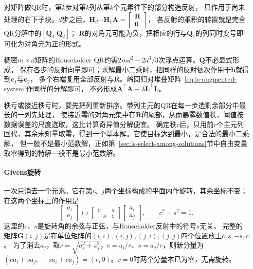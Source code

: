 对矩阵做QR时，第$k$步对第$k$列从第$k$个元素往下的部分构造反射，
只作用于尚未处理的右下子块。$d$步之后，$\bm H_d\cdots\bm H_1\bm A=\left[\begin{smallmatrix}\bm R\\\bm0\end{smallmatrix}\right]$，
各反射的乘积的转置就是完全QR分解中的$[\bm Q_1\;\bm Q_2]$；
$\bm R$的对角元可能为负，把相应的行与$\bm Q_1$的列同时变号即可化为对角元为正的形式。

稠密$m\times d$矩阵的Householder QR约需$2md^2-2d^3/3$次浮点运算。$\bm Q$不必显式形成，
保存各步的反射向量即可；求解最小二乘时，把同样的反射依次作用于$\bm b$就得到$\bm c_1$与$\bm c_2$，
多个右端复用全部反射与$\bm R$。岭回归对堆叠矩阵~\eqref{eq:ls-augmented-system}作同样的分解即可，
不必形成$\bm A^\top\bm A+\lambda\bm L^\top\bm L$。

秩亏或接近秩亏时，要先把列重新排序。带列主元的QR在每一步选剩余部分中最长的一列先处理，
使接近零的对角元集中在$\bm R$的尾部，从而暴露数值秩，阈值按数据误差的尺度选取，这比计算奇异值分解便宜。
确定秩$r$后，只用前$r$个主元列回代，其余未知量取零，得到一个基本解。它使目标达到最小，是合法的最小二乘解，
但一般不是最小范数解，正如第~\ref{sec:ls-select-among-solutions}节中自由变量取零得到的特解一般不是最小范数解。

\paragraph{Givens旋转}

一次只消去一个元素。它在第$i$、$j$两个坐标构成的平面内作旋转，其余坐标不变；
在这两个坐标上的作用是
\begin{equation}
 \begin{bmatrix}a_i\\a_j\end{bmatrix}\mapsto
 \begin{bmatrix}c&s\\-s&c\end{bmatrix}
 \begin{bmatrix}a_i\\a_j\end{bmatrix},
 \qquad c^2+s^2=1.
 \label{eq:ls-givens}
\end{equation}
这里的$c$、$s$是旋转角的余弦与正弦，与Householder反射中的符号$s$无关。
完整的矩阵$\bm G(i,j)$是在单位矩阵的$(i,i),(i,j),(j,i),(j,j)$四个位置放上$c,s,-s,c$。
为了消去$a_j$，取$r=\sqrt{a_i^2+a_j^2}$，$c=a_i/r$、$s=a_j/r$，则新分量为
$(ca_i+sa_j,\,-sa_i+ca_j)=(r,0)$。$r=0$时两个分量本已为零，无需旋转。

